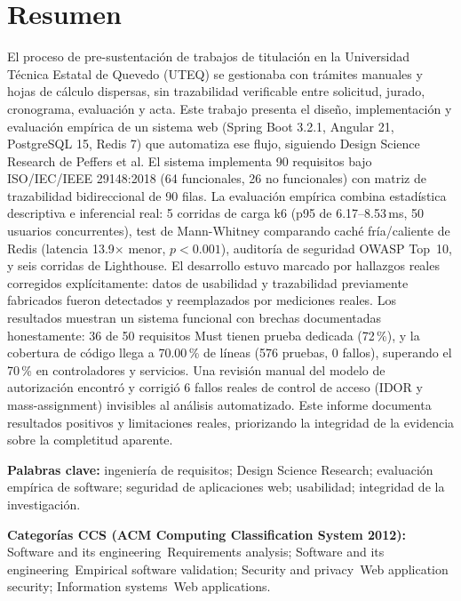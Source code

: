 \section*{Resumen}

El proceso de pre-sustentación de trabajos de titulación en la Universidad Técnica Estatal de Quevedo
(UTEQ) se gestionaba con trámites manuales y hojas de cálculo dispersas, sin trazabilidad verificable
entre solicitud, jurado, cronograma, evaluación y acta. Este trabajo presenta el diseño, implementación y
evaluación empírica de un sistema web (Spring Boot 3.2.1, Angular 21, PostgreSQL 15, Redis 7) que
automatiza ese flujo, siguiendo Design Science Research de Peffers et al. El sistema implementa 90
requisitos bajo ISO/IEC/IEEE 29148:2018 (64 funcionales, 26 no funcionales) con matriz de trazabilidad
bidireccional de 90 filas. La evaluación empírica combina estadística descriptiva e inferencial real:
5 corridas de carga k6 (p95 de 6.17--8.53\,ms, 50 usuarios concurrentes), test de Mann-Whitney comparando
caché fría/caliente de Redis (latencia 13.9$\times$ menor, $p<0.001$), auditoría de seguridad OWASP
Top~10, y seis corridas de Lighthouse. El desarrollo estuvo marcado por hallazgos reales corregidos
explícitamente: datos de usabilidad y trazabilidad previamente fabricados fueron detectados y
reemplazados por mediciones reales. Los resultados muestran un sistema funcional con brechas
documentadas honestamente: 36 de 50 requisitos Must tienen prueba dedicada (72\,\%), y la cobertura de
código llega a 70.00\,\% de líneas (576 pruebas, 0 fallos), superando el 70\,\% en controladores y servicios. Una
revisión manual del modelo de
autorización encontró y corrigió 6 fallos reales de control de acceso (IDOR y mass-assignment) invisibles
al análisis automatizado. Este informe documenta resultados positivos y limitaciones reales, priorizando
la integridad de la evidencia sobre la completitud aparente.

\textbf{Palabras clave:} ingeniería de requisitos; Design Science Research; evaluación empírica de
software; seguridad de aplicaciones web; usabilidad; integridad de la investigación.

\textbf{Categorías CCS (ACM Computing Classification System 2012):}
Software and its engineering~Requirements analysis;
Software and its engineering~Empirical software validation;
Security and privacy~Web application security;
Information systems~Web applications.

\newpage

